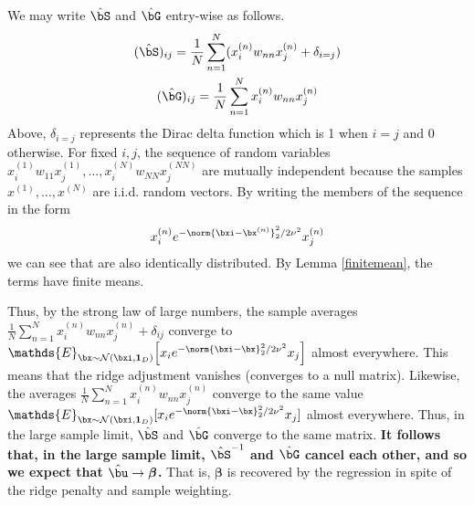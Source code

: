 \documentclass[11pt]{article}
\begin{document}
    We may write $\hat{\bS}$ and $\hat{\bG}$ entry-wise as follows.
    \begin{gather*}
        (\hat{\bS})_{ij} = \frac{1}{N}\sum_{n=1}^N( x_i^{(n)} w_{nn} x_j^{(n)} + \delta_{i=j}) \\
        (\hat{\bG})_{ij} = \frac{1}{N} \sum_{n=1}^N x_i^{(n)} w_{nn} x_j^{(n)} 
    \end{gather*}
    Above, $\delta_{i=j}$ represents the Dirac delta function which is 1 when $i=j$ and 0 otherwise. For fixed $i,j$, the sequence of random variables $x_i^{(1)} w_{11} x_j^{(1)},\ldots,x_i^{(N)} w_{NN} x_j^{(NN)}$ are mutually independent because the samples $x^{(1)},\ldots,x^{(N)}$ are i.i.d. random vectors. 
    By writing the members of the sequence in the form
    \begin{equation*}   
        x_i^{(n)} e^{-\norm{\bxi - \bx^{(n)}}_2^2/2\nu^2} x_j^{(n)}
    \end{equation*}
    we can see that are also identically distributed. %
    By Lemma \ref{finitemean}, the terms have finite means. 
    
Thus, by the strong law of large numbers, the sample averages
$\frac{1}{N}\sum_{n=1}^N x_i^{(n)} w_{nn} x_j^{(n)}+\delta_{ij}$
converge to
$\mathds{E}_{\bx \sim \mathcal{N}(\bxi,\mathbf{1}_{D})}\!\left[x_i e^{-\norm{\bxi-\bx}_2^2/2\nu^2}x_j\right]$
almost everywhere. This means that the ridge adjustment vanishes (converges to a null matrix). Likewise, the averages $\frac{1}{N}\sum_{n=1}^N x_i^{(n)} w_{nn} x_j^{(n)}$ converge to the same value $\mathds{E}_{\bx \sim \mathcal{N}(\bxi,\mathbf{1}_{D})}[x_i e^{-\norm{\bxi-\bx}_2^2/2\nu^2}x_j]$ almost everywhere. Thus, in the large sample limit, $\hat{\bS}$ and $\hat{\bG}$ converge to the same matrix. \textbf{It follows that, in the large sample limit, $\hat{\bS}^{-1}$ and $\hat{\bG}$ cancel each other, and so we expect that $\hat{\bu} \rightarrow \boldsymbol{\beta}$.} That is, $\boldsymbol{\beta}$ is recovered by the regression in spite of the ridge penalty and sample weighting. 
    
    
    
    
\end{document}

